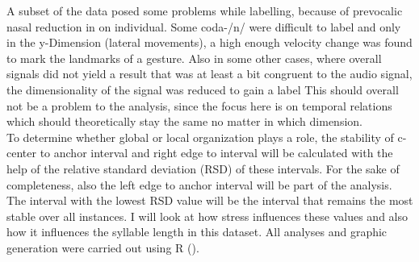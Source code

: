 \documentclass[../Proposal.tex]{subfiles}
\begin{document}
A subset of the data posed some problems while labelling, because of prevocalic nasal reduction in on individual. Some coda-/n/ were difficult to label and only in the y-Dimension (lateral movements), a high enough velocity change was found to mark the landmarks of a gesture. Also in some other cases, where overall signals did not yield a result that was at least a bit congruent to the audio signal, the dimensionality of the signal was reduced to gain a label
This should overall not be a problem to the analysis, since the focus here is on temporal relations which should theoretically stay the same no matter in which dimension.\\
To determine whether global or local organization plays a role, the stability of c-center to anchor interval and right edge to interval will be calculated with the help of the relative standard deviation (RSD) of these intervals. For the sake of completeness, also the left edge to anchor interval will be part of the analysis. The interval with the lowest RSD value will be the interval that remains the most stable over all instances. 
I will look at how stress influences these values and also how it influences the syllable length in this dataset. All analyses and graphic generation were carried out using R (\cite{R}).
\end{document}

